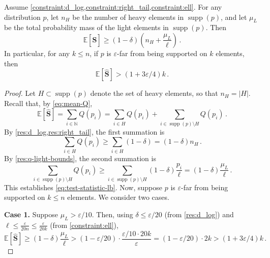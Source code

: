 \documentclass{theoretics}
\DeclareMathOperator{\supp}{supp}   %
\newcommand{\Ex}[1]{\bE \left[ #1 \right]}
\newcommand{\bE}{\ensuremath{\mathbb{E}}}
\newcommand{\bN}{\ensuremath{\mathbb{N}}}
\renewcommand{\epsilon}{\varepsilon}
\begin{document}
\begin{lemma}
    \label{res:soundness-refinement}
    Assume \cref{constraint:d_log,constraint:right_tail,constraint:ell}. For any distribution $p$,
    let $n_H$ be the number of heavy elements in $\supp(p)$, and let $\mu_L$ be the total
    probability mass of the light elements in $\supp(p)$. Then
    \begin{equation}
        \label{eq:test-statistic-lb}
        \Ex{\bm{\widehat S}} \ge (1-\delta) \left( n_H + \frac{\mu_L}{\ell} \right) \,.
    \end{equation}
    In particular, for any $k \leq n$, if $p$ is $\epsilon$-far from being supported on $k$
    elements, then
    \[
        \Ex{\bm{\widehat S}} > (1 + 3\epsilon/4) k \,.
    \]
\end{lemma}
\begin{proof}
    Let $H \subset \supp(p)$ denote the set of heavy elements, so that $n_H = |H|$. Recall that, by
    \eqref{eq:mean-Q},
    \[
        \Ex{\bm{\widehat S}}
        = \sum_{i \in \bN} Q(p_i)
        = \sum_{i \in H} Q(p_i) + \sum_{i \in \supp(p) \setminus H} Q(p_i) \,.
    \]
    By \cref{res:d_log,res:right_tail}, the first summation is
    \[
        \sum_{i \in H} Q(p_i)
        \ge \sum_{i \in H} (1-\delta)
        = (1-\delta) n_H \,.
    \]
    By \cref{res:q-light-bounds}, the second summation is
    \[
        \sum_{i \in \supp(p) \setminus H} Q(p_i)
        \ge \sum_{i \in \supp(p) \setminus H} (1-\delta) \frac{p_i}{\ell}
        = (1-\delta) \frac{\mu_L}{\ell} \,.
    \]
    This establishes \eqref{eq:test-statistic-lb}. Now, suppose $p$ is $\epsilon$-far from being
    supported on $k \le n$ elements. We consider two cases.

    \textbf{Case 1.} Suppose $\mu_L > \epsilon/10$. Then, using $\delta \le \epsilon/20$ (from
    \cref{res:d_log}) and $\ell \le \frac{\epsilon}{20n} \leq \frac{\epsilon}{20k}$
    (from \cref{constraint:ell}),
    \[
        \Ex{\bm{\widehat S}}
        \ge (1-\delta) \frac{\mu_L}{\ell}
        > (1 - \epsilon/20) \cdot \frac{\epsilon/10 \cdot 20k}{\epsilon}
        = (1 - \epsilon/20) \cdot 2k
        > (1 + 3\epsilon/4) k \,.
    \]


\end{proof}
\end{document}
